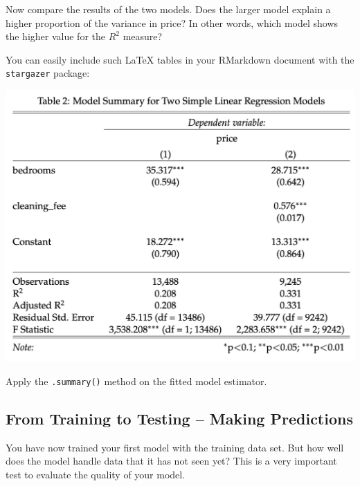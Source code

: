 \documentclass[
  11pt,
]{article}
\newenvironment{tips}[1]
  {
  \begin{itemize}
  \footnotesize
  \renewcommand{\labelitemi}{
    \raisebox{-.7\height}[0pt][0pt]{
      {\setkeys{Gin}{width=3em,keepaspectratio}
        \texttt{[image: images/\#1.png]}}
    }
  }
  \setlength{\fboxsep}{1em}
  \begin{rbox}
  \item
  }
  {
  \end{rbox}
  \end{itemize}
  }
\newenvironment{tipsp}[1]
  {
  \begin{itemize}
  \footnotesize
  \renewcommand{\labelitemi}{
    \raisebox{-.7\height}[0pt][0pt]{
      {\setkeys{Gin}{width=3em,keepaspectratio}
        \texttt{[image: images/\#1.png]}}
    }
  }
  \setlength{\fboxsep}{1em}
  \begin{pbox}
  \item
  }
  {
  \end{pbox}
  \end{itemize}
  }
\begin{document}
Now compare the results of the two models. Does the larger model explain a higher proportion of the variance in price? In other words, which model shows the higher value for the \(R^2\) measure?

\begin{tips}r

You can easily include such LaTeX tables in your RMarkdown document with the \texttt{stargazer} package:

\begin{center}\includegraphics[width=1\linewidth]{plot/5_table} \end{center}


\end{tips}

\begin{tipsp}p
Apply the \texttt{.summary()} method on the fitted model estimator.

\end{tipsp}

\hypertarget{from-training-to-testing-making-predictions}{%
\subsection{From Training to Testing -- Making Predictions}\label{from-training-to-testing-making-predictions}}

You have now trained your first model with the training data set. But how well does the model handle data that it has not seen yet? This is a very important test to evaluate the quality of your model.
\end{document}
